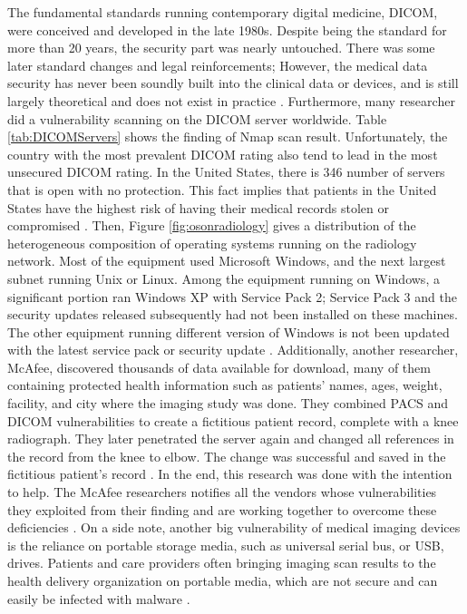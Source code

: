\documentclass[pdf,bookmarks,colorlinks=true]{IEEEtran}
\begin{document}
The fundamental standards running contemporary digital medicine, DICOM, were conceived and developed in the late 1980s. Despite being the standard for more than 20 years, the security part was nearly untouched. There was some later standard changes and legal reinforcements; However, the medical data security has never been soundly built into the clinical data or devices, and is still largely theoretical and does not exist in practice  \cite{ferrara2019cybersecurity} \cite{ma2019medical} \cite{stites2016secure}. Furthermore, many researcher did a vulnerability scanning on the DICOM server worldwide. Table \ref{tab:DICOMServers} shows the finding of Nmap scan result. Unfortunately, the country with the most prevalent DICOM rating also tend to lead in the most unsecured DICOM rating. In the United States, there is 346 number of servers that is open with no protection. This fact implies that patients in the United States have the highest risk of having their medical records stolen or compromised \cite{stites2016secure}. Then, Figure \ref{fig:osonradiology} gives a distribution of the heterogeneous composition of operating systems running on the radiology network. Most of the equipment used Microsoft Windows, and the next largest subnet running Unix or Linux. Among the equipment running on Windows, a significant portion ran Windows XP with Service Pack 2; Service Pack 3 and the security updates released subsequently had not been installed on these machines. The other equipment running different version of Windows is not been updated with the latest service pack or security update \cite{moses2015lack}.  Additionally, another researcher, McAfee, discovered thousands of data available for download, many of them containing protected health information such as patients' names, ages, weight, facility, and city where the imaging study was done. They combined PACS and DICOM vulnerabilities to create a fictitious patient record, complete with a knee radiograph. They later penetrated the server again and changed all references in the record from the knee to elbow. The change was successful and saved in the fictitious patient's record \cite{ferrara2019cybersecurity}. In the end, this research was done with the intention to help. The McAfee researchers notifies all the vendors whose vulnerabilities they exploited from their finding and are working together to overcome these deficiencies  \cite{McAfee}. On a side note, another big vulnerability of medical imaging devices is the reliance on portable storage media, such as universal serial bus, or USB, drives. Patients and care providers often bringing imaging scan results to the health delivery organization on portable media, which are not secure and can easily be infected with malware \cite{ferrara2019cybersecurity}. 
\end{document}
